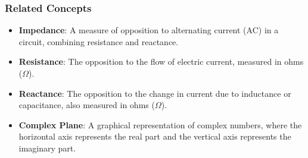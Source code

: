 \subsubsection{Related Concepts}
\begin{itemize}
    \item \textbf{Impedance}: A measure of opposition to alternating current (AC) in a circuit, combining resistance and reactance.
    \item \textbf{Resistance}: The opposition to the flow of electric current, measured in ohms ($\Omega$).
    \item \textbf{Reactance}: The opposition to the change in current due to inductance or capacitance, also measured in ohms ($\Omega$).
    \item \textbf{Complex Plane}: A graphical representation of complex numbers, where the horizontal axis represents the real part and the vertical axis represents the imaginary part.
\end{itemize}

